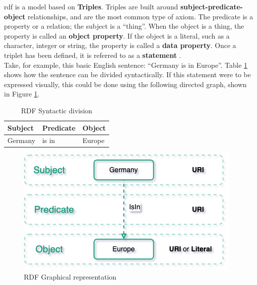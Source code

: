     \acrshort{rdf} is a model based on \textbf{Triples}. Triples are built around \textbf{subject-predicate-object} relationships, and are the most common type of axiom. The predicate is a property or a relation; the subject is a “thing”. When the object is a thing, the property is called an \textbf{object property}. If the object is a literal, such as a character, integer or string, the property is called a \textbf{data property}. Once a triplet has been defined, it is referred to as a \textbf{statement} \cite{noy2001ontology}.\\

    Take, for example, this basic English sentence: “Germany is in Europe”. Table \ref{tab:rdf-example} shows how the sentence can be divided syntactically. If this statement were to be expressed visually, this could be done using the following directed graph, shown in Figure \ref{fig:rdf-example}.\\
    
    \begin{table}[h]
        \centering
	    \begin{tabular}{ | m{4cm} | m{4cm} | m{4cm} | }
            \hline
            \rowcolor{teal!30} \textbf{Subject} & \textbf{Predicate} & \textbf{Object} \\
            
            \hline
            Germany  & is in & Europe\\
            
            \hline
        \end{tabular}
        \caption{\label{tab:rdf-example} RDF Syntactic division}
        \end{table}
        
    \begin{figure}[h]
        \centering
        \includegraphics[scale=0.6]{images/Foundation-RDF Example.drawio.png}
        \caption{\label{fig:rdf-example}  RDF Graphical representation}
    \end{figure}

